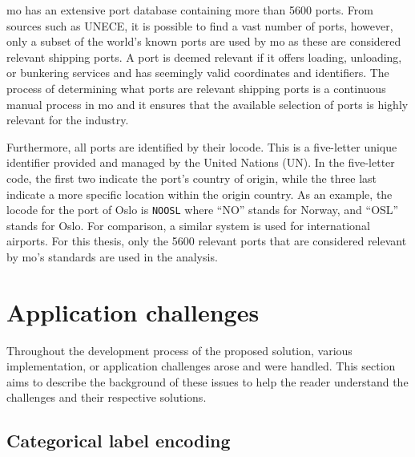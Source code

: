\acrshort{mo} has an extensive port database containing more than 5600 ports. From sources such as UNECE, it is possible to find a vast number of ports, however, only a subset of the world's known ports are used by \acrshort{mo} as these are considered relevant shipping ports. A port is deemed relevant if it offers loading, unloading, or bunkering services and has seemingly valid coordinates and identifiers. The process of determining what ports are relevant shipping ports is a continuous manual process in \acrshort{mo} and it ensures that the available selection of ports is highly relevant for the industry.

Furthermore, all ports are identified by their \gls{locode}. This is a five-letter unique identifier provided and managed by the United Nations (UN). In the five-letter code, the first two indicate the port's country of origin, while the three last indicate a more specific location within the origin country. As an example, the \gls{locode} for the port of Oslo is \texttt{NOOSL} where ``NO'' stands for Norway, and ``OSL'' stands for Oslo. For comparison, a similar system is used for international airports. For this thesis, only the 5600 relevant ports that are considered relevant by \acrshort{mo}'s standards are used in the analysis.

\section{Application challenges}

Throughout the development process of the proposed solution, various implementation, or application challenges arose and were handled. This section aims to describe the background of these issues to help the reader understand the challenges and their respective solutions.

\subsection{Categorical label encoding}
\label{sec:label_encoding}

